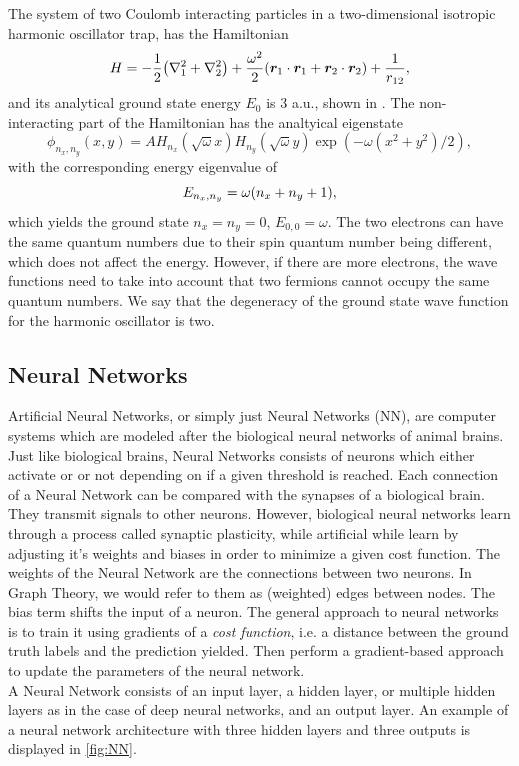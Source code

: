 The system of two Coulomb interacting particles in a two-dimensional isotropic harmonic oscillator trap, has the Hamiltonian 
\begin{equation}\label{eq:2dHamiltonian}
    H = -\frac{1}{2}\qty(\laplacian_1 + \laplacian_2) + \frac{\omega^2}{2}\qty(\bm{r}_1\cdot\bm{r}_1 + \bm{r}_2\cdot\bm{r}_2) + \frac{1}{r_{12}}, 
\end{equation}
and its analytical ground state energy $E_0$ is $3$ a.u., shown in \citep{PhysRevA.48.3561}. The non-interacting part of the Hamiltonian has the analtyical eigenstate 
\begin{equation}
    \phi_{n_x,n_y}(x,y) = A H_{n_x}(\sqrt{\omega}x)H_{n_y}(\sqrt{\omega}y)\exp{(-\omega(x^2+y^2)/2)}, 
\end{equation}
with the corresponding energy eigenvalue of 
\begin{equation*}
    E_{n_x, n_y} = \omega\qty(n_x + n_y + 1), 
\end{equation*}
which yields the ground state $n_x = n_y = 0$, $E_{0, 0}=\omega$. The two electrons can have the same quantum numbers due to their spin quantum number being different, which does not affect the energy. However, if there are more electrons, the wave functions need to take into account that two fermions cannot occupy the same quantum numbers. We say that the degeneracy of the ground state wave function for the harmonic oscillator is two. 

\subsection{Neural Networks}
Artificial Neural Networks, or simply just Neural Networks (NN), are computer systems which are modeled after the biological neural networks of animal brains. Just like biological brains, Neural Networks consists of neurons which either activate or or not depending on if a given threshold is reached. Each connection of a Neural Network can be compared with the synapses of a biological brain. They transmit signals to other neurons. However, biological neural networks learn through a process called synaptic plasticity, while artificial while learn by adjusting it's weights and biases in order to minimize a given cost function. The weights of the Neural Network are the connections between two neurons. In Graph Theory, we would refer to them as (weighted) edges between nodes. The bias term shifts the input of a neuron. The general approach to neural networks is to train it using gradients of a \textit{cost function}, i.e. a distance between the ground truth labels and the prediction yielded. Then perform a gradient-based approach to update the parameters of the neural network. 
\\
A Neural Network consists of an input layer, a hidden layer, or multiple hidden layers as in the case of deep neural networks, and an output layer. An example of a neural network architecture with three hidden layers and three outputs is displayed in \autoref{fig:NN}. %

